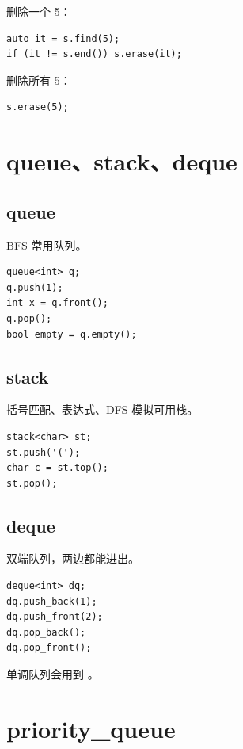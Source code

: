 删除一个 5：

\begin{lstlisting}
auto it = s.find(5);
if (it != s.end()) s.erase(it);
\end{lstlisting}

删除所有 5：

\begin{lstlisting}
s.erase(5);
\end{lstlisting}

\section{queue、stack、deque}\label{sec:04-20}

\subsection{queue}

BFS 常用队列。

\begin{lstlisting}
queue<int> q;
q.push(1);
int x = q.front();
q.pop();
bool empty = q.empty();
\end{lstlisting}

\subsection{stack}

括号匹配、表达式、DFS 模拟可用栈。

\begin{lstlisting}
stack<char> st;
st.push('(');
char c = st.top();
st.pop();
\end{lstlisting}


\subsection{deque}

双端队列，两边都能进出。

\begin{lstlisting}
deque<int> dq;
dq.push_back(1);
dq.push_front(2);
dq.pop_back();
dq.pop_front();
\end{lstlisting}

单调队列会用到 。

\section{priority\_queue}\label{sec:04-21}

